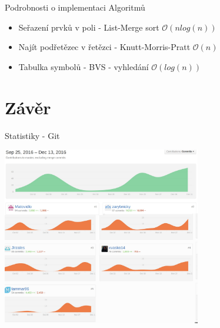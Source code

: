 \documentclass[13pt]{beamer}
\begin{document}
\begin{frame}{Podrobnosti o implementaci Algoritmů}

  \begin{itemize}
    \item Seřazení prvků v poli - List-Merge sort $\mathcal{O}(n log(n))$
    \item Najít podřetězec v řetězci - Knutt-Morris-Pratt $\mathcal{O}(n)$
    \item Tabulka symbolů - BVS - vyhledání $\mathcal{O}(log (n))$
  \end{itemize}
\end{frame}


\section{Závěr}
\begin{frame}{Statistiky - Git}
  \begin{center}
    \includegraphics[width=0.65\textwidth]{./img/git_commit.pdf}
  \end{center}
\end{frame}
\end{document}
